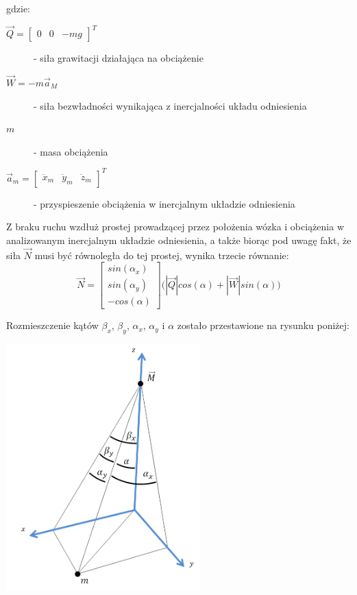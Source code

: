 \documentclass[10pt]{article}
\begin{document}
gdzie:
\begin{description}
\item[$\vec{Q} = \begin{bmatrix} 0 & 0 & -mg \end{bmatrix}^T$] - siła grawitacji działająca na obciążenie
\item[$\vec{W} = -m\vec{a}_M$] - siła bezwładności wynikająca z inercjalności układu odniesienia
\item[$m$] - masa obciążenia
\item[$\vec{a}_m = \begin{bmatrix} \ddot{x}_m & \ddot{y}_m & \ddot{z}_m \end{bmatrix}^T$] - przyspieszenie obciążenia w inercjalnym układzie odniesienia
\end{description}

Z braku ruchu wzdłuż prostej prowadzącej przez położenia wózka i obciążenia w analizowanym inercjalnym układzie odniesienia, a także biorąc pod uwagę fakt, że siła $\vec{N}$ musi być równoległa do tej prostej, wynika trzecie równanie:
\begin{equation}
\vec{N} = \begin{bmatrix} sin(\alpha_x) \\ sin(\alpha_y) \\ -cos(\alpha) \end{bmatrix}
\big( |\vec{Q}|cos(\alpha) + |\vec{W}|sin(\alpha) \big)
\end{equation}

Rozmieszczenie kątów $\beta_x$, $\beta_y$, $\alpha_x$, $\alpha_y$ i $\alpha$ zostało przestawione na rysunku poniżej:
\begin{center}
\includegraphics[width=7.5cm]{pic2mod}
\end{center}
\end{document}
